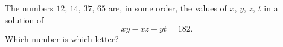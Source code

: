 The numbers $12$, $14$, $37$, $65$ are, in some order, the values of $x$, $y$, $z$, $t$ in a solution of
\[xy-xz+yt=182.\]
Which number is which letter?
